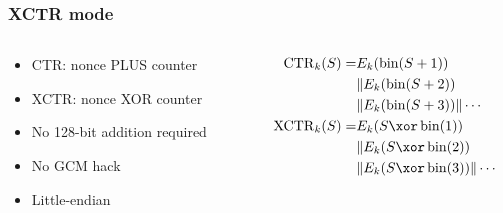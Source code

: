 \documentclass[aspectratio=169]{beamer}
\begin{document}
\begin{frame}
    \frametitle{XCTR mode}
    \begin{columns}
        \begin{column}{.4\textwidth}
            \begin{itemize}
                \item CTR: nonce PLUS counter
                \item XCTR: nonce XOR counter
                \item No 128-bit addition required
                \item No GCM hack
                \item Little-endian
            \end{itemize}
        \end{column}
        \begin{column}{.6\textwidth}
            \begin{align*}
                \operatorname{CTR}_k(S) =& E_k(\fromint(S + 1)) \\
                & \Concat  E_k(\fromint(S + 2)) \\ 
                & \Concat  E_k(\fromint(S + 3)) \Concat \cdots \\
                \XCTR_k(S) =& E_k(S \xor \fromint(1)) \\
                & \Concat  E_k(S \xor \fromint(2)) \\ 
                & \Concat  E_k(S \xor \fromint(3)) \Concat \cdots \\
            \end{align*}
        \end{column}
    \end{columns}
\end{frame}
\end{document}
